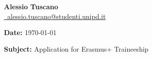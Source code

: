 \documentclass[a4paper,11pt]{article}
\begin{document}
\begin{flushright}
\textbf{Alessio Tuscano}\\
\href{mailto:alessio.tuscano@studenti.unipd.it}{\raisebox{-0.05\height}\faEnvelope \ alessio.tuscano@studenti.unipd.it} \\
\end{flushright}

\vspace{.5em}
\noindent
\textbf{Date:} \today

\vspace{.5em}
\noindent
\textbf{Subject:} Application for Erasmus+ Traineeship

\vspace{1em}
\noindent




\end{document}
